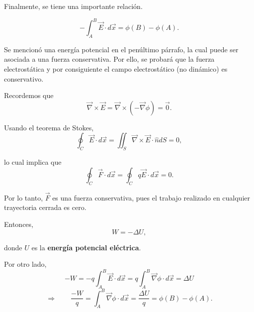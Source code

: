 Finalmente, se tiene una importante relación.
\begin{shaded}
    $$- \int_A^B \vec{E} \cdot d\vec{x} = \phi(B) - \phi(A).$$
\end{shaded}

Se mencionó una energía potencial en el penúltimo párrafo, la cual puede ser asociada a una fuerza conservativa. Por ello, se probará que la fuerza electrostática y por consiguiente el campo electrostático (no dinámico) es conservativo.

Recordemos que
$$\vec{\nabla} \times \vec{E} = \vec{ \nabla} \times (- \vec{\nabla} \phi) = \vec{0}.$$

Usando el teorema de Stokes,
$$\oint_C \vec{E} \cdot d\vec{x} = \iint_S \vec{\nabla} \times \vec{E} \cdot \hat{n} dS = 0,$$

lo cual implica que
$$\oint_C \vec{F} \cdot d\vec{x} = \oint_C q \vec{E} \cdot d\vec{x} = 0.$$

Por lo tanto, $\vec{F}$ es una fuerza conservativa, pues el trabajo realizado en cualquier trayectoria cerrada es cero.

Entonces,
$$W = -\Delta U,$$

donde $U$ es la \textbf{energía potencial eléctrica}.

Por otro lado,
$$-W = -q \int_A^B \vec{E} \cdot d\vec{x} = q \int_A^B \vec{\nabla} \phi \cdot d \vec{x} = \Delta U$$
$$\Rightarrow \qquad \frac{- W}{q} = \int_A^B \vec{\nabla} \phi \cdot d \vec{x} = \frac{\Delta U}{q} = \phi(B) - \phi(A).$$

